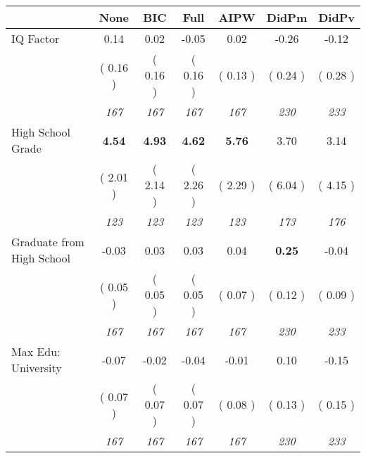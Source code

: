 \begin{tabular}{l c c c c c c}
\toprule
 & None & BIC & Full & AIPW & DidPm & DidPv \\
\midrule
IQ Factor &      0.14 &      0.02 &     -0.05 &      0.02 &     -0.26 &     -0.12 \\
& (     0.16 ) & (     0.16 ) & (     0.16 ) & (     0.13 ) & (     0.24 ) & (     0.28 ) \\
& \textit{ 167 } & \textit{ 167 } & \textit{ 167 } & \textit{ 167 } & \textit{ 230 } & \textit{ 233 } \\
High School Grade & \textbf{      4.54 } & \textbf{      4.93 } & \textbf{      4.62 } & \textbf{     5.76} &      3.70 &      3.14 \\
& (     2.01 ) & (     2.14 ) & (     2.26 ) & (     2.29 ) & (     6.04 ) & (     4.15 ) \\
& \textit{ 123 } & \textit{ 123 } & \textit{ 123 } & \textit{ 123 } & \textit{ 173 } & \textit{ 176 } \\
Graduate from High School &     -0.03 &      0.03 &      0.03 &      0.04 & \textbf{      0.25 } &     -0.04 \\
& (     0.05 ) & (     0.05 ) & (     0.05 ) & (     0.07 ) & (     0.12 ) & (     0.09 ) \\
& \textit{ 167 } & \textit{ 167 } & \textit{ 167 } & \textit{ 167 } & \textit{ 230 } & \textit{ 233 } \\
Max Edu: University &     -0.07 &     -0.02 &     -0.04 &     -0.01 &      0.10 &     -0.15 \\
& (     0.07 ) & (     0.07 ) & (     0.07 ) & (     0.08 ) & (     0.13 ) & (     0.15 ) \\
& \textit{ 167 } & \textit{ 167 } & \textit{ 167 } & \textit{ 167 } & \textit{ 230 } & \textit{ 233 } \\
\bottomrule
\end{tabular}
